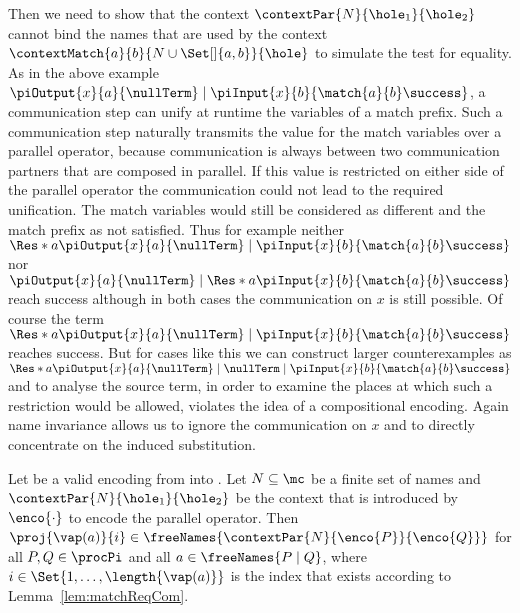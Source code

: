 \documentclass[final,copyright,creativecommons]{eptcs}
\begin{document}
Then we need to show that the context $ \contextPar{N}{\hole_1}{\hole_2} $ cannot bind the names that are used by the context $ \contextMatch{a}{b}{N \cup \Set[]{ a, b }}{\hole} $ to simulate the test for equality. As in the above example $ \piOutput{x}{a}{\nullTerm} \mid \piInput{x}{b}{\match{a}{b}\success} $, a communication step can unify at runtime the variables of a match prefix. Such a communication step naturally transmits the value for the match variables over a parallel operator, because communication is always between two communication partners that are composed in parallel. If this value is restricted on either side of the parallel operator the communication could not lead to the required unification. The match variables would still be considered as different and the match prefix as not satisfied. Thus for example neither $ \Res*{a}{\piOutput{x}{a}{\nullTerm}} \mid \piInput{x}{b}{\match{a}{b}\success} $ nor $ \piOutput{x}{a}{\nullTerm} \mid \Res*{a}{\piInput{x}{b}{\match{a}{b}\success}} $ reach success although in both cases the communication on $ x $ is still possible. Of course the term $ \Res*{a}{\piOutput{x}{a}{\nullTerm} \mid \piInput{x}{b}{\match{a}{b}\success}} $ reaches success. But for cases like this we can construct larger counterexamples as $ \Res*{a}{\piOutput{x}{a}{\nullTerm} \mid \nullTerm} \mid \piInput{x}{b}{\match{a}{b}\success} $ and to analyse the source term, in order to examine the places at which such a restriction would be allowed, violates the idea of a compositional encoding. Again name invariance allows us to ignore the communication on $ x $ and to directly concentrate on the induced substitution.

\begin{lemma}
	\label{lem:parContextNotRes}
	Let \encod be a valid encoding from \piT into \piNM.
	Let $ N \subseteq \mc $ be a finite set of names
	and $ \contextPar{N}{\hole_1}{\hole_2} $ be the context that is introduced by $ \enco{\cdot} $ to encode the parallel operator.
	Then $ \proj{\vap\!\left( a \right)}{i} \in \freeNames{\contextPar{N}{\enco{P}}{\enco{Q}}} $ for all $ P, Q \in \procPi $ and all $ a \in \freeNames{P \mid Q} $,
	where $ i \in \Set{ 1, \ldots, \length{\vap\!\left( a \right)} } $ is the index that exists according to Lemma~\ref{lem:matchReqCom}.
\end{lemma}
\end{document}
